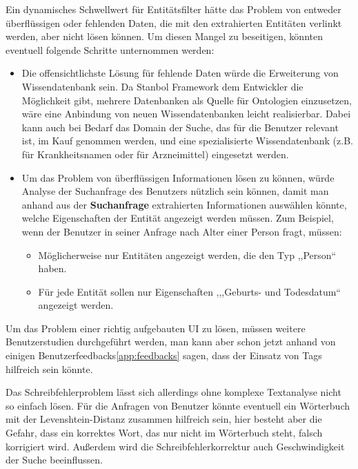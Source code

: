 Ein dynamisches Schwellwert für Entitätsfilter hätte das Problem von entweder überflüssigen oder fehlenden Daten, die mit den extrahierten Entitäten verlinkt werden, aber nicht lösen können. Um diesen Mangel zu beseitigen, könnten eventuell folgende Schritte unternommen werden:
\begin{itemize}
\item Die offensichtlichste Lösung für fehlende Daten würde die Erweiterung von Wissendatenbank sein. Da Stanbol Framework dem Entwickler die Möglichkeit gibt, mehrere Datenbanken als Quelle für Ontologien einzusetzen, wäre eine Anbindung von neuen Wissendatenbanken leicht realisierbar. Dabei kann auch bei Bedarf das Domain der Suche, das für die Benutzer relevant ist, im Kauf genommen werden, und eine spezialisierte Wissendatenbank (z.B. für Krankheitsnamen oder für Arzneimittel) eingesetzt werden.
\item Um das Problem von überflüssigen Informationen lösen zu können, würde Analyse der Suchanfrage des Benutzers nützlich sein können, damit man anhand aus der \textbf{Suchanfrage} extrahierten Informationen auswählen könnte, welche Eigenschaften der Entität angezeigt werden müssen. Zum Beispiel, wenn der Benutzer in seiner Anfrage nach Alter einer Person fragt, müssen:
\begin{itemize}
\item Möglicherweise nur Entitäten angezeigt werden, die den Typ ,,Person`` haben.
\item Für jede Entität sollen nur Eigenschaften ,,,Geburts- und Todesdatum`` angezeigt werden.
\end{itemize}
\end{itemize}

Um das Problem einer richtig aufgebauten UI zu lösen, müssen weitere Benutzerstudien durchgeführt werden, man kann aber schon jetzt anhand von einigen Benutzerfeedbacks\ref{app:feedbacks} sagen, dass der Einsatz von Tags hilfreich sein könnte.

Das Schreibfehlerproblem lässt sich allerdings ohne komplexe Textanalyse nicht so einfach lösen. Für die Anfragen von Benutzer könnte eventuell ein Wörterbuch mit der Levenshtein-Distanz zusammen hilfreich sein, hier besteht aber die Gefahr, dass ein korrektes Wort, das nur nicht im Wörterbuch steht, falsch korrigiert wird. Außerdem wird die Schreibfehlerkorrektur auch Geschwindigkeit der Suche beeinflussen.

